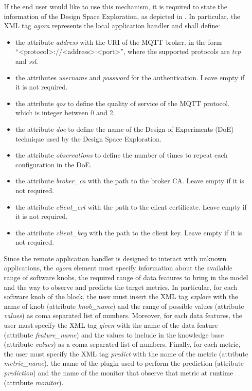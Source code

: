 If the end user would like to use this mechanism, it is required to state the information of the Design Space Exploration, as depicted in .
In particular, the XML tag \textit{agora} represents the local application handler and shall define:
\begin{itemize}
	\item the attribute \textit{address} with the URI of the MQTT broker, in the form ``<protocol>://<address>:<port>'', where the supported protocols are \textit{tcp} and \textit{ssl}.
	\item the attributes \textit{username} and \textit{password} for the authentication. Leave empty if it is not required.
	\item the attribute \textit{qos} to define the quality of service of the MQTT protocol, which is integer between 0 and 2.
	\item the attribute \textit{doe} to define the name of the Design of Experiments (DoE) technique used by the Design Space Exploration.
	\item the attribute \textit{observations} to define the number of times to repeat each configuration in the DoE.
  \item the attribute \textit{broker\_ca} with the path to the broker CA. Leave empty if it is not required.
  \item the attribute \textit{client\_crt} with the path to the client certificate. Leave empty if it is not required.
  \item the attribute \textit{client\_key} with the path to the client key. Leave empty if it is not required.
\end{itemize}

Since the remote application handler is designed to interact with unknown applications, the \textit{agora} element must specify information about the available range of software knobs, the required range of data features to bring in the model and the way to observe and predicts the target metrics.
In particular, for each software knob of the block, the user must insert the XML tag \textit{explore} with the name of knob (attribute \textit{knob\_name}) and the range of possible values (attribute \textit{values}) as coma separated list of numbers.
Moreover, for each data features, the user must specify the XML tag \textit{given} with the name of the data feature (attribute \textit{feature\_name}) and the values to include in the knowledge base (attribute \textit{values}) as a coma separated list of numbers.
Finally, for each metric, the user must specify the XML tag \textit{predict} with the name of the metric (attribute \textit{metric\_name}), the name of the plugin used to perform the prediction (attribute \textit{prediction}) and the name of the monitor that observe that metric at runtime (attribute \textit{monitor}).




